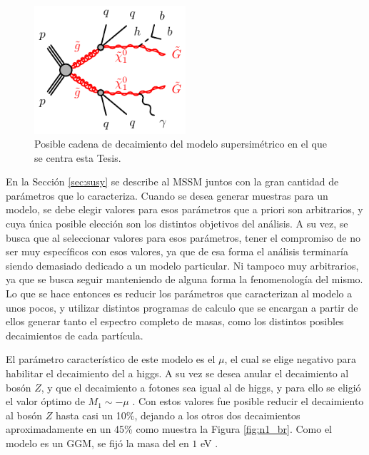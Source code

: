 \begin{figure}
  \centering
  \includegraphics[width=0.5\textwidth]{images/analysis/gogo-qqqqbbphGG-h.pdf}
  \caption{Posible cadena de decaimiento del modelo supersimétrico en el que se centra esta Tesis.}
  \label{fig:phb_feyn}
\end{figure}

En la Sección \ref{sec:susy} se describe al MSSM juntos con la gran cantidad de parámetros que lo caracteriza. Cuando se desea generar muestras para un modelo, se debe elegir valores para esos parámetros que a priori son arbitrarios, y cuya única posible elección son los distintos objetivos del análisis. A su vez, se busca que al seleccionar valores para esos parámetros, tener el compromiso de no ser muy específicos con esos valores, ya que de esa forma el análisis terminaría siendo demasiado dedicado a un modelo particular. Ni tampoco muy arbitrarios, ya que se busca seguir manteniendo de alguna forma la fenomenología del mismo. Lo que se hace entonces es reducir los parámetros que caracterizan al modelo a unos pocos, y utilizar distintos programas de calculo que se encargan a partir de ellos generar tanto el espectro completo de masas, como los distintos posibles decaimientos de cada partícula.

El parámetro característico de este modelo es el $\mu$, el cual se elige negativo para habilitar el decaimiento del \ninoone a higgs. A su vez se desea anular el decaimiento al bosón $Z$, y que el decaimiento a fotones sea igual al de higgs, y para ello se eligió el valor óptimo de $M_1\sim -\mu$ . Con estos valores fue posible reducir el decaimiento al bosón $Z$ hasta casi un 10\%, dejando a los otros dos decaimientos aproximadamente en un 45\% como muestra la Figura \ref{fig:n1_br}. Como el modelo es un GGM, se fijó la masa del \gravino en $1$ eV . 

